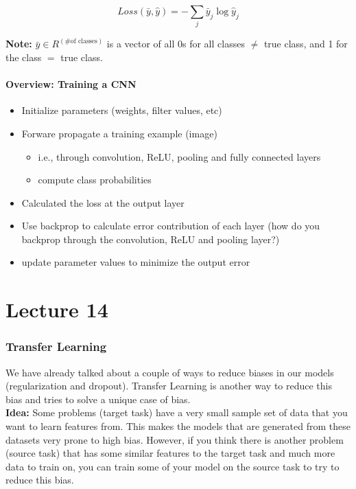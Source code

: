 \documentclass[12pt]{article}
\begin{document}
\[ Loss(\bar y, \hat y) = -\sum_j \bar y_j \log \hat y_j\]

\textbf{Note:} $\bar y \in R^{(\text{\# of classes})}$ is a vector of all 0s for all classes $\ne$ true class, and 1 for the class $=$ true class. 

\subsection{Overview: Training a CNN}

\begin{itemize}
	\item Initialize parameters (weights, filter values, etc)
	\item Forware propagate a training example (image)
		\begin{itemize}
			\item i.e., through convolution, ReLU, pooling and fully connected layers
			\item compute class probabilities
		\end{itemize}
	\item Calculated the loss at the output layer
	\item Use backprop to calculate error contribution of each layer (how do you backprop through the convolution, ReLU and pooling layer?)
	\item update parameter values to minimize the output error
\end{itemize}

\newpage

\part{Lecture 14}

\section{Transfer Learning}

We have already talked about a couple of ways to reduce biases in our models (regularization and dropout). Transfer Learning is another way to reduce this bias and tries to solve a unique case of bias.\\

\textbf{Idea:} Some problems (target task) have a very small sample set of data that you want to learn features from. This makes the models that are generated from these datasets very prone to high bias. However, if you think there is another problem (source task) that has some similar features to the target task and much more data to train on, you can train some of your model on the source task to try to reduce this bias.
\end{document}
